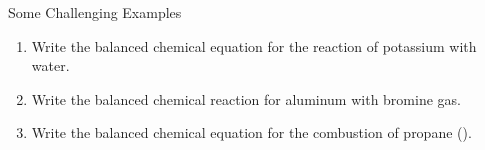\documentclass[notes=hide]{beamer}
\begin{document}
\clearpage

\begin{frame}[t]{Some Challenging Examples}
	\begin{enumerate}[<+->]
		\item Write the balanced chemical equation for the reaction of
			potassium with water.

			\vfill


		\item Write the balanced chemical reaction for aluminum with
			bromine gas.

			\vfill


		\item Write the balanced chemical equation for the combustion of
			propane ().

			\vfill

	\end{enumerate}
\end{frame}
\end{document}
